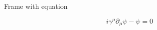 \documentclass[10pt]{beamer}
\begin{document}





\begin{frame}[fragile]{Frame with equation}

$$i\gamma^{\mu}\partial_{\mu}\psi-\psi=0$$
\end{frame}
\end{document}
